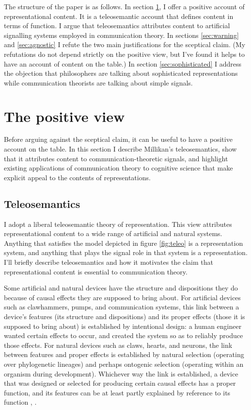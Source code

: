 \documentclass[12pt]{article}
\begin{document}
The structure of the paper is as follows.
In section \ref{sec:positive}, I offer a positive account of representational content.
It is a teleosemantic account that defines content in terms of function.
I argue that teleosemantics attributes content to artificial signalling systems employed in communication theory.
In sections \ref{sec:warning} and \ref{sec:agnostic} I refute the two main justifications for the sceptical claim.
(My refutations do not depend strictly on the positive view, but I've found it helps to have an account of content on the table.)
In section \ref{sec:sophisticated} I address the objection that philosophers are talking about sophisticated representations while communication theorists are talking about simple signals.


\section{The positive view}\label{sec:positive}

Before arguing against the sceptical claim, it can be useful to have a positive account on the table.
In this section I describe Millikan's teleosemantics, show that it attributes content to communication-theoretic signals, and highlight existing applications of communication theory to cognitive science that make explicit appeal to the contents of representations.

\subsection{Teleosemantics}
I adopt a liberal teleosemantic theory of representation.
This view attributes representational content to a wide range of artificial and natural systems.
Anything that satisfies the model depicted in figure \ref{fig:teleo} is a representation system, and anything that plays the signal role in that system is a representation.
I'll briefly describe teleosemantics and how it motivates the claim that representational content is essential to communication theory.



Some artificial and natural devices have the structure and dispositions they do because of causal effects they are supposed to bring about.
For artificial devices such as clawhammers, pumps, and communication systems, this link between a device's features (its structure and dispositions) and its proper effects (those it is supposed to bring about) is established by intentional design: a human engineer wanted certain effects to occur, and created the system so as to reliably produce those effects.
For natural devices such as claws, hearts, and neurons, the link between features and proper effects is established by natural selection (operating over phylogenetic lineages) and perhaps ontogenic selection (operating within an organism during development).
Whichever way the link is established, a device that was designed or selected for producing certain causal effects has a proper function, and its features can be at least partly explained by reference to its function \citep[$\SS$1-2]{millikan1984language}, \citep[$\S$2]{millikan1993white}.
\end{document}
